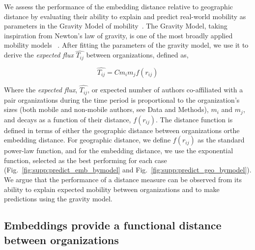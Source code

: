 \documentclass[12pt]{article} %
\begin{document}
We assess the performance of the embedding distance relative to geographic distance by evaluating their ability to explain and predict real-world mobility as parameters in the Gravity Model of mobility~\autocite{zipf1946gravity, barbosa2018human}.
The Gravity Model, taking inspiration from Newton's law of gravity, is one of the most broadly applied mobility models~\autocite{curiel2018citygravity, lewer2008immigrationgravity, jung2008highwaygravity, hong2016busgravity, truscott2012epidemicgravity, xia2005measlesgravity} . After fitting the parameters of the gravity model, we use it to derive the \textit{expected flux} $\hat{T_{ij}}$ between organizations, defined as,

\begin{equation}
	\label{eq:gravity_basic}
	\hat{T_{ij}} = Cm_{i}m_{j}f(r_{ij})
\end{equation}

Where the \textit{expected flux}, $\hat{T_{ij}}$, or expected number of authors co-affiliated with a pair organizations during the time period is proportional to the organization's sizes (both mobile and non-mobile authors, see Data and Methods), $m_{i}$ and $m_{j}$, and decays as a function of their distance, $f(r_{ij})$.
The distance function is defined in terms of either the geographic distance between organizations orthe embedding distance. 
For geographic distance, we define $f(r_{ij})$ as the standard power-law function, and for the embedding distance, we use the exponential function, selected as the best performing for each case (Fig.~\ref{fig:supp:predict_emb_bymodel} and Fig.~\ref{fig:supp:predict_geo_bymodel}).
We argue that the performance of a distance measure can be observed from its ability to explain expected mobility between organizations and to make predictions using the gravity model.

%
%
%
\subsection*{Embeddings provide a functional distance between organizations}
\end{document}
